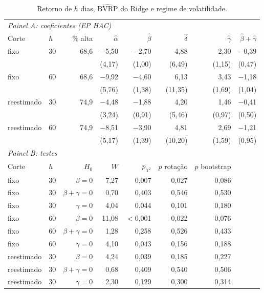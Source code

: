 \begin{table}[H]
\centering
\footnotesize
\caption{Retorno de $h$ dias, $\widehat{\text{BVRP}}$ do Ridge e regime de volatilidade.}
\label{tab:apb2-regime}
\begin{tabular}{llrrrrrr}
\toprule
\multicolumn{8}{l}{\textit{Painel A: coeficientes (EP HAC)}} \\
Corte & $h$ & \% alta & $\hat\alpha$ & $\hat\beta$ & $\hat\delta$ & $\hat\gamma$ & $\hat\beta + \hat\gamma$ \\
\midrule
fixo & 30 & 68{,}6 & $-$5{,}50 & $-$2{,}70 & 4{,}88 & 2{,}30 & $-$0{,}39 \\
 & & & (4{,}17) & (1{,}00) & (6{,}49) & (1{,}15) & (0{,}47) \\
fixo & 60 & 68{,}6 & $-$9{,}92 & $-$4{,}60 & 6{,}13 & 3{,}43 & $-$1{,}18 \\
 & & & (5{,}76) & (1{,}38) & (11{,}35) & (1{,}69) & (1{,}04) \\
reestimado & 30 & 74{,}9 & $-$4{,}48 & $-$1{,}88 & 4{,}20 & 1{,}46 & $-$0{,}41 \\
 & & & (3{,}24) & (0{,}91) & (5{,}46) & (0{,}97) & (0{,}50) \\
reestimado & 60 & 74{,}9 & $-$8{,}51 & $-$3{,}90 & 4{,}81 & 2{,}69 & $-$1{,}21 \\
 & & & (5{,}17) & (1{,}39) & (10{,}20) & (1{,}59) & (0{,}95) \\
\midrule
\multicolumn{8}{l}{\textit{Painel B: testes}} \\
Corte & $h$ & $H_0$ & $W$ & $p_{\chi^2}$ & $p$ rotação & $p$ bootstrap & \\
fixo & 30 & $\beta = 0$ & 7{,}27 & 0{,}007 & 0{,}027 & 0{,}086 & \\
fixo & 30 & $\beta + \gamma = 0$ & 0{,}70 & 0{,}403 & 0{,}546 & 0{,}530 & \\
fixo & 30 & $\gamma = 0$ & 4{,}04 & 0{,}044 & 0{,}101 & 0{,}180 & \\
fixo & 60 & $\beta = 0$ & 11{,}08 & $<$0{,}001 & 0{,}022 & 0{,}076 & \\
fixo & 60 & $\beta + \gamma = 0$ & 1{,}28 & 0{,}258 & 0{,}526 & 0{,}433 & \\
fixo & 60 & $\gamma = 0$ & 4{,}10 & 0{,}043 & 0{,}156 & 0{,}188 & \\
reestimado & 30 & $\beta = 0$ & 4{,}24 & 0{,}039 & 0{,}185 & 0{,}227 & \\
reestimado & 30 & $\beta + \gamma = 0$ & 0{,}68 & 0{,}409 & 0{,}540 & 0{,}506 & \\
reestimado & 30 & $\gamma = 0$ & 2{,}30 & 0{,}129 & 0{,}300 & 0{,}314 & \\

\end{tabular}
\end{table}
